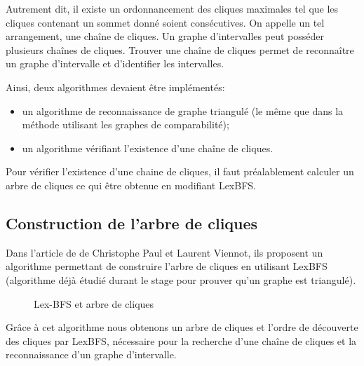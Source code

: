 \documentclass[12pt, a4paper]{report}
\begin{document}
	 Autrement dit, il existe un ordonnancement des cliques maximales tel que les cliques contenant un sommet donné soient consécutives. On appelle un tel arrangement, une chaîne de cliques. Un graphe d'intervalles peut posséder plusieurs chaînes de cliques. Trouver une chaîne de cliques permet de reconnaître un graphe d'intervalle et d'identifier les intervalles.
	
	Ainsi, deux algorithmes devaient être implémentés:
	\begin{itemize}
	\item un algorithme de reconnaissance de graphe triangulé (le même que dans la méthode utilisant les graphes de comparabilité);
	\item un algorithme vérifiant l'existence d'une chaîne de cliques.
	\end{itemize}
	
	Pour vérifier l'existence d'une chaine de  cliques, il faut préalablement calculer un arbre de cliques ce qui être obtenue en modifiant LexBFS.
	
	\subsection{Construction de l'arbre de cliques}
	
	Dans l'article de de Christophe Paul et Laurent Viennot, ils proposent un algorithme permettant de construire l'arbre de cliques en utilisant LexBFS (algorithme déjà étudié durant le stage pour prouver qu'un graphe est triangulé).
	
	\begin{figure}[H]

	\begin{algorithm}[H]
	\caption{Lex-BFS et arbre de cliques~\cite{PV}}
\end{algorithm}
	\end{figure}
	Grâce à cet algorithme nous obtenons un arbre de cliques et l'ordre de découverte des cliques par LexBFS, nécessaire pour la recherche d'une chaîne de cliques et la reconnaissance d'un graphe d'intervalle.
	
\end{document}
